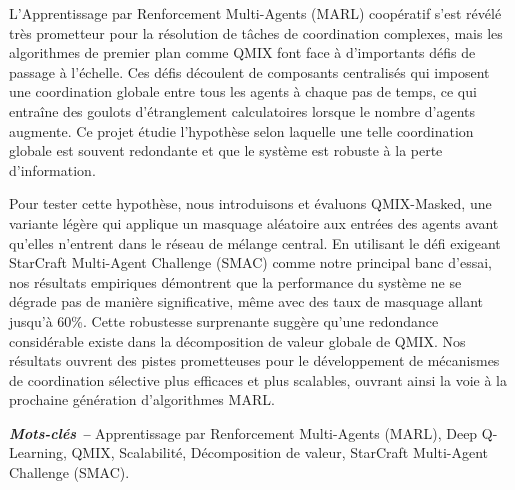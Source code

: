 \documentclass[../Main.tex]{subfiles}
\begin{document}
L'Apprentissage par Renforcement Multi-Agents (MARL) coopératif s'est révélé très prometteur pour la résolution de tâches de coordination complexes, mais les algorithmes de premier plan comme QMIX font face à d'importants défis de passage à l'échelle. Ces défis découlent de composants centralisés qui imposent une coordination globale entre tous les agents à chaque pas de temps, ce qui entraîne des goulots d'étranglement calculatoires lorsque le nombre d'agents augmente. Ce projet étudie l'hypothèse selon laquelle une telle coordination globale est souvent redondante et que le système est robuste à la perte d'information.

Pour tester cette hypothèse, nous introduisons et évaluons QMIX-Masked, une variante légère qui applique un masquage aléatoire aux entrées des agents avant qu'elles n'entrent dans le réseau de mélange central. En utilisant le défi exigeant StarCraft Multi-Agent Challenge (SMAC) comme notre principal banc d'essai, nos résultats empiriques démontrent que la performance du système ne se dégrade pas de manière significative, même avec des taux de masquage allant jusqu'à 60\%. Cette robustesse surprenante suggère qu'une redondance considérable existe dans la décomposition de valeur globale de QMIX. Nos résultats ouvrent des pistes prometteuses pour le développement de mécanismes de coordination sélective plus efficaces et plus scalables, ouvrant ainsi la voie à la prochaine génération d'algorithmes MARL.

\par\vspace*{\fill} %
\textbf{\textit{Mots-clés --}} Apprentissage par Renforcement Multi-Agents (MARL), Deep Q-Learning, QMIX, Scalabilité, Décomposition de valeur, StarCraft Multi-Agent Challenge (SMAC).

\biblio %
\end{document}
